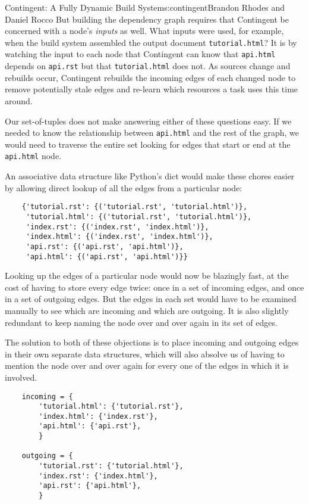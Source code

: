 \begin{aosachapter}{Contingent: A Fully Dynamic Build System}{s:contingent}{Brandon Rhodes and Daniel Rocco}
But building the dependency graph requires that Contingent be concerned
with a node's \emph{inputs} as well. What inputs were used, for example,
when the build system assembled the output document
\texttt{tutorial.html}? It is by watching the input to each node that
Contingent can know that \texttt{api.html} depends on \texttt{api.rst}
but that \texttt{tutorial.html} does not. As sources change and rebuilds
occur, Contingent rebuilds the incoming edges of each changed node to
remove potentially stale edges and re-learn which resources a task uses
this time around.

Our set-of-tuples does not make answering either of these questions
easy. If we needed to know the relationship between \texttt{api.html}
and the rest of the graph, we would need to traverse the entire set
looking for edges that start or end at the \texttt{api.html} node.

An associative data structure like Python's dict would make these chores
easier by allowing direct lookup of all the edges from a particular
node:

\begin{verbatim}
    {'tutorial.rst': {('tutorial.rst', 'tutorial.html')},
     'tutorial.html': {('tutorial.rst', 'tutorial.html')},
     'index.rst': {('index.rst', 'index.html')},
     'index.html': {('index.rst', 'index.html')},
     'api.rst': {('api.rst', 'api.html')},
     'api.html': {('api.rst', 'api.html')}}
\end{verbatim}

Looking up the edges of a particular node would now be blazingly fast,
at the cost of having to store every edge twice: once in a set of
incoming edges, and once in a set of outgoing edges. But the edges in
each set would have to be examined manually to see which are incoming
and which are outgoing. It is also slightly redundant to keep naming the
node over and over again in its set of edges.

The solution to both of these objections is to place incoming and
outgoing edges in their own separate data structures, which will also
absolve us of having to mention the node over and over again for every
one of the edges in which it is involved.

\begin{verbatim}
    incoming = {
        'tutorial.html': {'tutorial.rst'},
        'index.html': {'index.rst'},
        'api.html': {'api.rst'},
        }

    outgoing = {
        'tutorial.rst': {'tutorial.html'},
        'index.rst': {'index.html'},
        'api.rst': {'api.html'},
        }
\end{verbatim}


\end{aosachapter}
